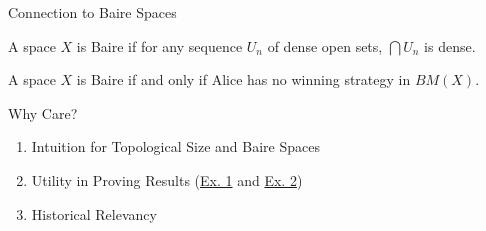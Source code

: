 \documentclass{beamer}
\begin{document}
\begin{frame}{Connection to Baire Spaces}
    \begin{definition}
        A space $X$ is Baire if for any sequence $U_n$ of dense open sets, $\bigcap U_n$ is dense.
    \end{definition}

    \pause

    \begin{theorem}
        A space $X$ is Baire if and only if Alice has no winning strategy in $BM(X)$.
    \end{theorem}
\end{frame}

\begin{frame}{Why Care?}
    \pause
    \begin{enumerate}[<+->]
        \item Intuition for Topological Size and Baire Spaces
        \item Utility in Proving Results (\href{https://arxiv.org/pdf/2211.00432}{Ex. 1} and \href{https://arxiv.org/pdf/2506.11118}{Ex. 2})
        \item Historical Relevancy
    \end{enumerate}
\end{frame}
\end{document}
